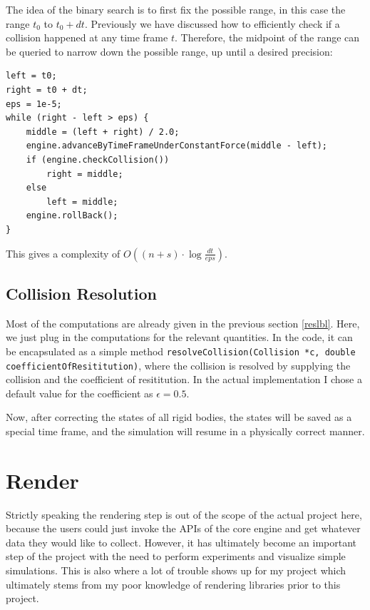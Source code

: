 \documentclass[12pt,a4paper,twoside,openright]{report}
\newcommand{\code}{\texttt}
\begin{document}
The idea of the binary search is to first fix the possible range, in this case the range $t_0$ to $t_0 + dt$. Previously we have discussed how to efficiently check if a collision happened at any time frame $t$. Therefore, the midpoint of the range can be queried to narrow down the possible range, up until a desired precision:

\begin{verbatim}
left = t0;
right = t0 + dt;
eps = 1e-5;
while (right - left > eps) {
    middle = (left + right) / 2.0;
    engine.advanceByTimeFrameUnderConstantForce(middle - left);
    if (engine.checkCollision())
        right = middle;
    else
        left = middle;
    engine.rollBack();
}
\end{verbatim}

This gives a complexity of $O((n + s) \cdot \log \frac{dt}{eps})$.

\subsection{Collision Resolution}

Most of the computations are already given in the previous section \ref{reslbl}. Here, we just plug in the computations for the relevant quantities. In the code, it can be encapsulated as a simple method \code{resolveCollision(Collision *c, double coefficientOfResititution)}, where the collision is resolved by supplying the collision and the coefficient of resititution. 
In the actual implementation I chose a default value for the coefficient as $\epsilon = 0.5$. 

Now, after correcting the states of all rigid bodies, the states will be saved as a special time frame, and the simulation will resume in a physically correct manner.

\section{Render}\label{renderimplbl}

Strictly speaking the rendering step is out of the scope of the actual project here, because the users could just invoke the APIs of the core engine and get whatever data they would like to collect. However, it has ultimately become an important step of the project with the need to perform experiments and visualize simple simulations. This is also where a lot of trouble shows up for my project which ultimately stems from my poor knowledge of rendering libraries prior to this project.
\end{document}
